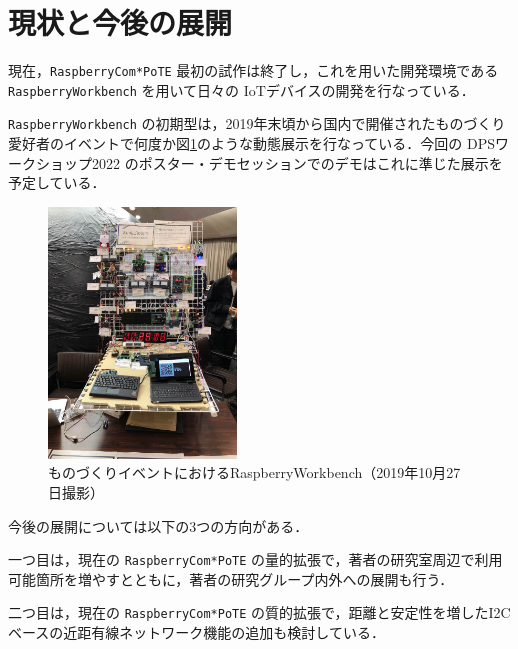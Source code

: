 {%

\section{現状と今後の展開}

\label{sec:07nextstep}

現在，{\tt Raspberry\-Com*PoTE} 最初の試作は終了し，これを用いた開発環境である {\tt Raspberry\-Workbench} を用いて日々の IoTデバイスの開発を行なっている．


{\tt Raspberry\-Workbench} の初期型は，2019年末頃から国内で開催されたものづくり愛好者のイベントで何度か図\ref{RaspberryWorkbench}のような動態展示を行なっている．今回の DPSワークショップ2022 のポスター・デモセッションでのデモはこれに準じた展示を予定している．

\begin{figure}[H]
\centering
\includegraphics[width=5cm]{figspics/RaspberryWorkbench2.jpg}
\caption{ものづくりイベントにおける{RaspberryWorkbench}（2019年10月27日撮影）}
\label{RaspberryWorkbench}
\end{figure}

今後の展開については以下の3つの方向がある．

一つ目は，現在の {\tt Raspberry\-Com*PoTE} の量的拡張で，著者の研究室周辺で利用可能箇所を増やすとともに，著者の研究グループ内外への展開も行う．


二つ目は，現在の {\tt Raspberry\-Com*PoTE} の質的拡張で，距離と安定性を増したI2Cベースの近距有線ネットワーク機能の追加も検討している．


}
